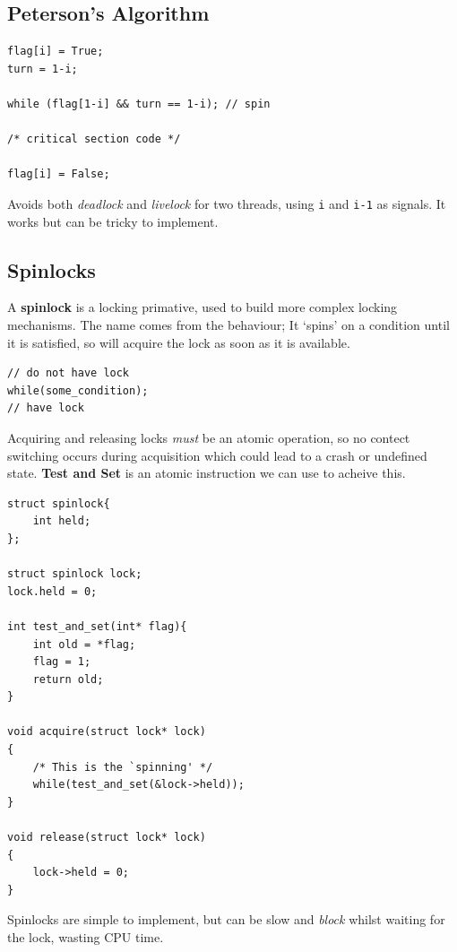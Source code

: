 \documentclass{article}
\begin{document}
\subsection{Peterson's Algorithm}\label{petersons-algorithm}

\begin{verbatim}
flag[i] = True;
turn = 1-i;

while (flag[1-i] && turn == 1-i); // spin

/* critical section code */

flag[i] = False;
\end{verbatim}

Avoids both \emph{deadlock} and \emph{livelock} for two threads, using
\texttt{i} and \texttt{i-1} as signals. It works but can be tricky to
implement.

\subsection{Spinlocks}\label{spinlocks}

A \textbf{spinlock} is a locking primative, used to build more complex
locking mechanisms. The name comes from the behaviour; It `spins' on a
condition until it is satisfied, so will acquire the lock as soon as it
is available.

\begin{verbatim}
// do not have lock
while(some_condition);
// have lock
\end{verbatim}

Acquiring and releasing locks \emph{must} be an atomic operation, so no
contect switching occurs during acquisition which could lead to a crash
or undefined state. \textbf{Test and Set} is an atomic instruction we
can use to acheive this.

\begin{verbatim}
struct spinlock{
    int held;
};

struct spinlock lock;
lock.held = 0;

int test_and_set(int* flag){
    int old = *flag;
    flag = 1;
    return old;
}

void acquire(struct lock* lock)
{
    /* This is the `spinning' */
    while(test_and_set(&lock->held));
}

void release(struct lock* lock)
{
    lock->held = 0;
}
\end{verbatim}

Spinlocks are simple to implement, but can be slow and \emph{block}
whilst waiting for the lock, wasting CPU time.
\end{document}
